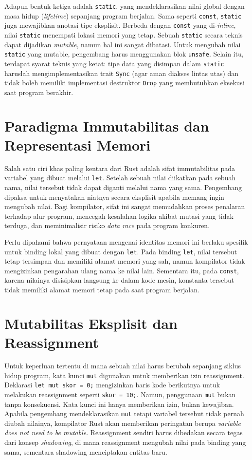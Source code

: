 \documentclass[11pt,a4paper]{article}
\begin{document}
Adapun bentuk ketiga adalah \texttt{static}, yang mendeklarasikan nilai global dengan masa hidup (\textit{lifetime}) sepanjang program berjalan. Sama seperti \texttt{const}, \texttt{static} juga mewajibkan anotasi tipe eksplisit. Berbeda dengan \texttt{const} yang di-\textit{inline}, nilai \texttt{static} menempati lokasi memori yang tetap. Sebuah \texttt{static} secara teknis dapat dijadikan \textit{mutable}, namun hal ini sangat dibatasi. Untuk mengubah nilai \texttt{static} yang mutable, pengembang harus menggunakan blok \texttt{unsafe}. Selain itu, terdapat syarat teknis yang ketat: tipe data yang disimpan dalam \texttt{static} haruslah mengimplementasikan trait \texttt{Sync} (agar aman diakses lintas utas) dan tidak boleh memiliki implementasi destruktor \texttt{Drop} yang membutuhkan eksekusi saat program berakhir.

\section{Paradigma Immutabilitas dan Representasi Memori}

Salah satu ciri khas paling kentara dari Rust adalah sifat immutabilitas pada variabel yang dibuat melalui \texttt{let}. Setelah sebuah nilai diikatkan pada sebuah nama, nilai tersebut tidak dapat diganti melalui nama yang sama. Pengembang dipaksa untuk menyatakan niatnya secara eksplisit apabila memang ingin mengubah nilai. Bagi kompilator, sifat ini sangat memudahkan proses penalaran terhadap alur program, mencegah kesalahan logika akibat mutasi yang tidak terduga, dan meminimalisir risiko \textit{data race} pada program konkuren.

Perlu dipahami bahwa pernyataan mengenai identitas memori ini berlaku spesifik untuk binding lokal yang dibuat dengan \texttt{let}. Pada binding \texttt{let}, nilai tersebut tetap tersimpan dan memiliki alamat memori yang sah, namun kompilator tidak mengizinkan pengarahan ulang nama ke nilai lain. Sementara itu, pada \texttt{const}, karena nilainya disisipkan langsung ke dalam kode mesin, konstanta tersebut tidak memiliki alamat memori tetap pada saat program berjalan.

\section{Mutabilitas Eksplisit dan Reassignment}

Untuk keperluan tertentu di mana sebuah nilai harus berubah sepanjang siklus hidup program, kata kunci \texttt{mut} digunakan untuk memberikan izin reassignment. Deklarasi \texttt{let mut skor = 0;} mengizinkan baris kode berikutnya untuk melakukan reassignment seperti \texttt{skor = 10;}. Namun, penggunaan \texttt{mut} bukan tanpa konsekuensi. Kata kunci ini hanya memberikan izin, bukan kewajiban. Apabila pengembang mendeklarasikan \texttt{mut} tetapi variabel tersebut tidak pernah diubah nilainya, kompilator Rust akan memberikan peringatan berupa \textit{variable does not need to be mutable}. Reassignment sendiri harus dibedakan secara tegas dari konsep \textit{shadowing}, di mana reassignment mengubah nilai pada binding yang sama, sementara shadowing menciptakan entitas baru.
\end{document}

